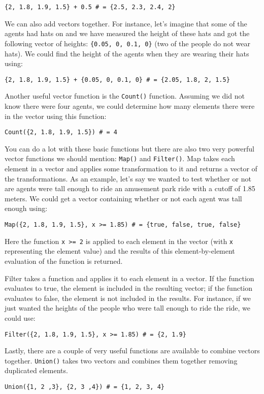 \documentclass[]{memoir}
\begin{document}
\lstinline!{2, 1.8, 1.9, 1.5} + 0.5 # = {2.5, 2.3, 2.4, 2}!

We can also add vectors together. For instance, let's imagine that some
of the agents had hats on and we have measured the height of these hats
and got the following vector of heights: \lstinline!{0.05, 0, 0.1, 0}!
(two of the people do not wear hats). We could find the height of the
agents when they are wearing their hats using:

\lstinline!{2, 1.8, 1.9, 1.5} + {0.05, 0, 0.1, 0} # = {2.05, 1.8, 2, 1.5}!

Another useful vector function is the \lstinline!Count()! function.
Assuming we did not know there were four agents, we could determine how
many elements there were in the vector using this function:

\lstinline!Count({2, 1.8, 1.9, 1.5}) # = 4!

You can do a lot with these basic functions but there are also two very
powerful vector functions we should mention: \lstinline!Map()! and
\lstinline!Filter()!. Map takes each element in a vector and applies
some transformation to it and returns a vector of the transformations.
As an example, let's say we wanted to test whether or not are agents
were tall enough to ride an amusement park ride with a cutoff of 1.85
meters. We could get a vector containing whether or not each agent was
tall enough using:

\lstinline!Map({2, 1.8, 1.9, 1.5}, x >= 1.85) # = {true, false, true, false}!

Here the function \lstinline!x >= 2! is applied to each element in the
vector (with \lstinline!x! representing the element value) and the
results of this element-by-element evaluation of the function is
returned.

Filter takes a function and applies it to each element in a vector. If
the function evaluates to true, the element is included in the resulting
vector; if the function evaluates to false, the element is not included
in the results. For instance, if we just wanted the heights of the
people who were tall enough to ride the ride, we could use:

\lstinline!Filter({2, 1.8, 1.9, 1.5}, x >= 1.85) # = {2, 1.9}!

Lastly, there are a couple of very useful functions are available to
combine vectors together. \lstinline!Union()! takes two vectors and
combines them together removing duplicated elements.

\lstinline!Union({1, 2 ,3}, {2, 3 ,4}) # = {1, 2, 3, 4}!
\end{document}
